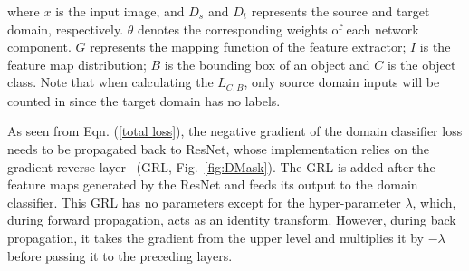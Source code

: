 \documentclass[10pt,twocolumn,letterpaper]{article}
\begin{document}
\noindent where $x$ is the input image, and $D_s$ and $D_t$ represents the source and target domain, respectively. $\theta$ denotes the corresponding weights of each network component. $G$ represents the mapping function of the feature extractor; $I$ is the feature map distribution; $B$ is the bounding box of an object and $C $ is the object class. Note that when calculating the $L_{C, B}$, only source domain inputs will be counted in since the target domain has no labels. 

As seen from Eqn. (\ref{total loss}), the negative gradient of the domain classifier loss needs to be propagated back to ResNet, whose implementation relies on the gradient reverse layer~\cite{ganin2014unsupervised} (GRL, Fig.~\ref{fig:DMask}). The GRL is added after the feature maps generated by the ResNet and feeds its output to the domain classifier. This GRL has no parameters except for the hyper-parameter $\lambda$, which, during forward propagation, acts as an identity transform. However, during back propagation, it takes the gradient from the upper level and multiplies it by $-\lambda$ before passing it to the preceding layers. 




\end{document}
